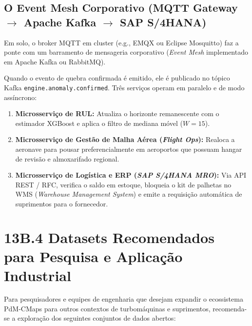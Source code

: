 \subsection{O Event Mesh Corporativo (MQTT Gateway $\to$ Apache Kafka $\to$ SAP S/4HANA)}
Em solo, o broker MQTT em cluster (e.g., EMQX ou Eclipse Mosquitto) faz a ponte com um barramento de mensageria corporativo (\textit{Event Mesh} implementado em Apache Kafka ou RabbitMQ).

Quando o evento de quebra confirmada é emitido, ele é publicado no tópico Kafka \texttt{engine.anomaly.confirmed}. Três serviços operam em paralelo e de modo assíncrono:
\begin{enumerate}
    \item \textbf{Microsserviço de RUL:} Atualiza o horizonte remanescente com o estimador XGBoost e aplica o filtro de mediana móvel ($W=15$).
    \item \textbf{Microsserviço de Gestão de Malha Aérea (\textit{Flight Ops}):} Realoca a aeronave para pousar preferencialmente em aeroportos que possuam hangar de revisão e almoxarifado regional.
    \item \textbf{Microsserviço de Logística e ERP (\textit{SAP S/4HANA MRO}):} Via API REST / RFC, verifica o saldo em estoque, bloqueia o kit de palhetas no WMS (\textit{Warehouse Management System}) e emite a requisição automática de suprimentos para o fornecedor.
\end{enumerate}

\section{13B.4 Datasets Recomendados para Pesquisa e Aplicação Industrial}
Para pesquisadores e equipes de engenharia que desejam expandir o ecossistema PdM-CMaps para outros contextos de turbomáquinas e suprimentos, recomenda-se a exploração dos seguintes conjuntos de dados abertos:

